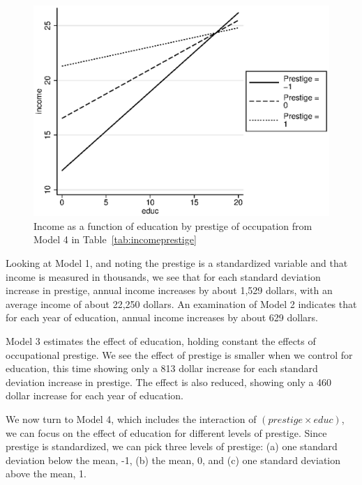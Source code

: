 \begin{figure}
   \centering
   \includegraphics[angle=0,
           width=.75\textwidth]{gssedupres.eps}
   \caption{Income as a function of education by prestige of occupation from Model 4 in Table~\ref{tab:incomeprestige}}
  \label{fig:gssedupres}
\end{figure}

Looking at Model 1, and noting the prestige is a standardized variable and that income is measured in thousands, we see that for each standard deviation increase in prestige, annual income increases by about 1,529 dollars, with an average income of about 22,250 dollars. An examination of Model 2 indicates that for each year of education, annual income increases by about 629 dollars.

Model 3 estimates the effect of education, holding constant the effects of occupational prestige. We see the effect of prestige is smaller when we control for education, this time showing only a 813 dollar increase for each standard deviation increase in prestige. The effect is also reduced, showing only a 460 dollar increase for each year of education.

We now turn to Model 4, which includes the interaction of $\left(prestige \times educ\right)$, we can focus on the effect of education for different levels of prestige. Since prestige is standardized, we can pick three levels of prestige: (a) one standard deviation below the mean, -1, (b) the mean, 0, and (c) one standard deviation above the mean, 1.

